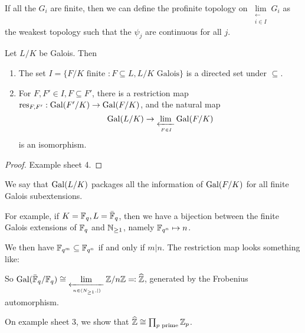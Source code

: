 \documentclass[10pt,a4paper]{article}
\begin{document}
If all the $G_i$ are finite, then we can define the profinite topology on $\lim\limits_{\substack{\leftarrow\\i\in I}} G_i$ as the weakest topology such that the $\psi_j$ are continuous for all $j$.

\begin{proposition}
  Let $L/K$ be Galois. Then
  \begin{enumerate}
    \item The set $I = \{F/K \text{ finite } : F\subseteq L, L/K \text{ Galois}\}$ is a directed set under $\subseteq$.
    \item For $F,F' \in I, F \subseteq F'$, there is a restriction map $\text{res}_{F,F'}:\operatorname{Gal}(F'/K) \to \operatorname{Gal}(F/K)$, and the natural map
    \[\operatorname{Gal}(L/K) \to \lim_{\xleftarrow[F\in I]{}}\operatorname{Gal}(F/K)\]
    is an isomorphism.
  \end{enumerate}
\end{proposition}
\begin{proof}
  Example sheet 4.
\end{proof}
We say that $\operatorname{Gal}(L/K)$ packages all the information of $\operatorname{Gal}(F/K)$ for all finite Galois subextensions.

For example, if $K = \mathbb{F}_q, L = \bar{\mathbb{F}}_q$, then we have a bijection between the finite Galois extensions of $\mathbb{F}_q$ and $\mathbb{N}_{\geq 1}$, namely $\mathbb{F}_{q^n} \mapsto n$.

We then have $\mathbb{F}_{q^m} \subseteq \mathbb{F}_{q^n}$ if and only if $m |n$. The restriction map looks something like:
\begin{center}
\end{center}
So $\operatorname{Gal}(\bar{\mathbb{F}}_q/\mathbb{F}_q) \cong \lim\limits_{\xleftarrow[n \in (N_{\geq 1}, |)]{}} \mathbb{Z}/n\mathbb{Z} \eqqcolon \widehat{\mathbb{Z}}$, generated by the Frobenius automorphism.

On example sheet 3, we show that $\widehat{\mathbb{Z}} \cong \prod_{p\text{ prime}}\mathbb{Z}_p$.
\end{document}
